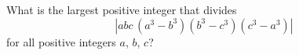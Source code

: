 What is the largest positive integer that divides
\[
\left|abc\,(a^3-b^3)(b^3-c^3)(c^3-a^3)\right|
\]
for all positive integers $a$, $b$, $c$?
